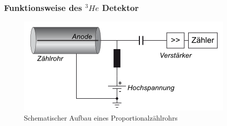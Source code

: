 \subsubsection{Funktionsweise des $^3He$ Detektor}
\begin{figure}
	\includegraphics {pics/schematic_construction_counting_tube.png}
	\caption {Schematischer Aufbau eines Proportionalzählrohrs\protect\footnotemark}
\end{figure}

